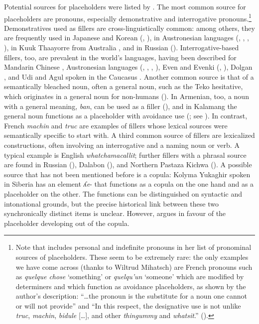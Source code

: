 \documentclass[output=paper]{langscibook}
\begin{document}
Potential sources for placeholders were listed by \citet{Podlesskaya2010}. The most common source for placeholders are pronouns, especially demonstrative and interrogative pronouns.\footnote{Note that \citet[12]{Podlesskaya2010} includes personal and indefinite pronouns in her list of pronominal sources of placeholders. These seem to be extremely rare: the only examples we have come across (thanks to Wiltrud Mihatsch) are French pronouns such as \textit{quelque chose} ‘something’ or \textit{quelqu’un} ‘someone’ which are modified by determiners and which function as avoidance placeholders, as shown by the author’s description: “…the pronoun is the substitute for a noun one cannot or will not provide” and “In this respect, the designative use is not unlike \textit{truc}, \textit{machin}, \textit{bidule} […], and other \textit{thingummy} and \textit{whatsit}.” (\citealt[10, 13]{Larrivee2009}).} Demonstratives used as fillers are cross-linguistically common: among others, they are frequently used in Japanese and Korean (\citealt{Hayashi2006}, \citealt{Seraku2022a}), in Austronesian languages (\citealt{Wouk2005}, \citealt[388--389]{Kluge2017}, \citealt{chapters/billings_mcdonnell}, \citealt{chapters/mcdonnell_billings}), in Kuuk Thaayorre from Australia \citep[252--254]{Gaby2017}, and in Russian (\citealt{Podlesskaya2009}). Interrogative-based fillers, too, are prevalent in the world’s languages, having been described for Mandarin Chinese \citep{Cheung2015}, Austronesian languages (\citealt{Dimock2010}, \citealt{Kluge2017}, \citealt{Nagaya2022}, \citealt{chapters/billings_mcdonnell}), Even and Evenki (\citealt{Matić2008}, \citealt{Klyachko2022}), Dolgan \citep{Dabritz2018}, and Udi and Agul spoken in the Caucasus \citep{Ganenkov2010}. Another common source is that of a semantically bleached noun, often a general noun, such as the Teko hesitative, which originates in a general noun for non-humans (\citealt{chapters/rose}). In Armenian, too, a noun with a general meaning, \textit{ban}, can be used as a filler (\citealt{KhurshudyanPodlesskaya2006}), and in Kalamang the general noun functions as a placeholder with avoidance use (\citealt{chapters/visser}; see ). In contrast, French \textit{machin} and \textit{truc} are examples of fillers whose lexical sources were semantically specific to start with. A third common source of fillers are lexicalized constructions, often involving an interrogative and a naming noun or verb. A typical example is English \textit{whatchamacallit}; further fillers with a phrasal source are found in Russian (\citealt{Podlesskaya2022}), Dalabon (\citealt{chapters/ponsonnet}), and Northern Pastaza Kichwa (\citealt{chapters/rice}). A possible source that has not been mentioned before is a copula: Kolyma Yukaghir spoken in Siberia has an element \textit{ʎe}- that functions as a copula on the one hand and as a placeholder on the other. The functions can be distinguished on syntactic and intonational grounds, but the precise historical link between these two synchronically distinct items is unclear. However, \citet{chapters/ventayol_boada} argues in favour of the placeholder developing out of the copula.
\end{document}

